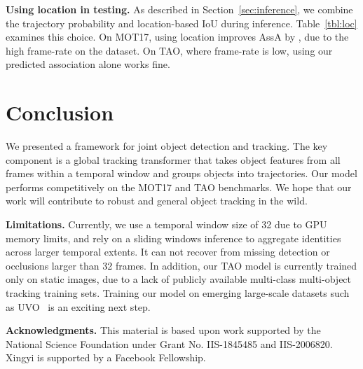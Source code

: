 \documentclass[10pt,twocolumn,letterpaper]{article}
\newcommand{\refsec}[1]{Section~\ref{sec:#1}}
\newcommand{\reftbl}[1]{Table~\ref{tbl:#1}}
\newcommand{\lblsec}[1]{\label{sec:#1}}
\begin{document}
\par \noindent \textbf{Using location in testing.} 
As described in \refsec{inference}, we combine the trajectory probability and location-based IoU during inference.
\reftbl{loc} examines this choice.
On MOT17, using location improves AssA by , due to the high frame-rate on the dataset.
On TAO, where frame-rate is low, using our predicted association alone works fine.

\section{Conclusion}
\lblsec{conclusions}
\vspace{-3mm}
We presented a framework for joint object detection and tracking.
The key component is a global tracking transformer that takes object features from all frames within a temporal window and groups objects into trajectories.
Our model performs competitively on the MOT17 and TAO benchmarks.
We hope that our work will contribute to robust and general object tracking in the wild.

\noindent\textbf{Limitations.} Currently, we use a temporal window size of 32 due to GPU memory limits, and rely on a sliding windows inference to aggregate identities across larger temporal extents.
It can not recover from missing detection or occlusions larger than 32 frames.
In addition, our TAO model is currently trained only on static images, due to a lack of publicly available multi-class multi-object tracking training sets.
Training our model on emerging large-scale datasets such as UVO~\cite{wang2021unidentified} is an exciting next step.


{\small
\par \noindent \textbf{Acknowledgments.}
This material is based upon work supported by the National Science Foundation under Grant No. IIS-1845485 and IIS-2006820.
Xingyi is supported by a Facebook Fellowship.
}


{\small


}
\end{document}
